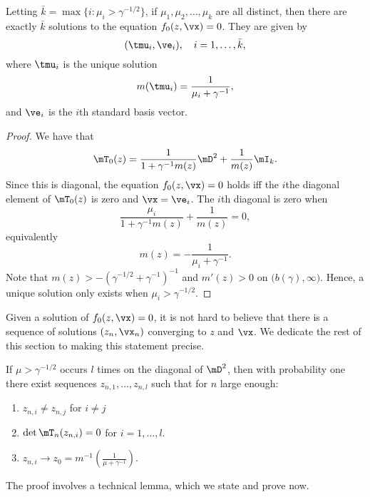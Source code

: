 \begin{lemma}
    Letting $\bar k = \max \{ i : \mu_i > \gamma^{-1/2} \}$, if $\mu_1, \mu_2, 
    \ldots, \mu_k$ are all distinct, then there are exactly
    $\bar k$ solutions to the equation $f_0( z, \vx ) = 0$.  They are given
    by
    \[
        ( \tmu_i, \ve_i ), \quad \text{$i = 1, \ldots, \bar k$},
    \]
    where $\tmu_i$ is the unique solution
    \[
        m( \tmu_i ) = \frac{1}{\mu_i + \gamma^{-1}},
    \]
    and $\ve_i$ is the $i$th standard basis vector.
\end{lemma}
\begin{proof}
    We have that 
    \[
        \mT_0(z) 
        = 
        \frac{1}{1 + \gamma^{-1} m(z)} \mD^2 
        + 
        \frac{1}{m(z)} \mI_k.
    \]
    Since this is diagonal, the equation $f_0(z, \vx) = 0$ holds iff the 
    $i$the diagonal element of $\mT_0(z)$ is zero and $\vx = \ve_i$.  The 
    $i$th diagonal is zero when 
    \[
        \frac{\mu_i}{1 + \gamma^{-1} m(z)} + \frac{1}{m(z)} = 0,
    \]
    equivalently
    \[
        m(z) = - \frac{1}{\mu_i + \gamma^{-1}}.
    \]
    Note that $m(z) > - \left( \gamma^{-1/2} + \gamma^{-1} \right)^{-1}$ and
    $m'(z) > 0$ on $\big( b(\gamma), \infty \big)$.  Hence, a unique solution
    only exists when $\mu_i > \gamma^{-1/2}$.
\end{proof}

Given a solution of $f_0(z, \vx) = 0$, it is not hard to believe that there is a sequence of solutions $(z_n, \vx_n)$ converging to $z$ and $\vx$.  We dedicate the rest of this section to making this statement precise.  

\begin{lemma}\label{L:zn-sequence-exists}
    If $\mu > \gamma^{-1/2}$ occurs $l$ times on the diagonal of $\mD^2$, then
    with probability one there exist sequences $z_{n,1}, 
    \ldots, z_{n,l}$ such that for $n$ large enough:
    \begin{enumerate}
        \item $z_{n,i} \neq z_{n,j}$ for $i \neq j$
        \item $\det \mT_n(z_{n,i}) = 0$ for $i = 1, \ldots, l$.
        \item $z_{n,i} \to 
                z_0 
                = 
                m^{-1} \left( \frac{1}{\mu + \gamma^{-1}} \right)$.
    \end{enumerate}
\end{lemma}

The proof involves a technical lemma, which we state and prove now.

